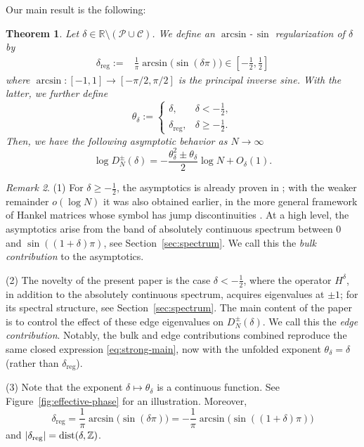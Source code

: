\documentclass[11pt,a4paper,reqno]{amsart}
\newtheorem{theorem}{Theorem}[section]
\theoremstyle{remark}
\newtheorem{remark}[theorem]{Remark}
\newcommand{\dist}{\operatorname{dist}}
\DeclarePairedDelimiter{\abs}{\lvert}{\rvert}
\begin{document}
Our main result is the following:

\begin{theorem}\label{thm:main}
Let $\delta\in\mathbb R\setminus(\mathcal P\cup\mathcal C)$. We define an $\arcsin$-\,$\sin$ regularization of $\delta$ by
\begin{align}\label{eq:def-sq}
 \delta_{\text{reg}}:=&\frac1\pi\arcsin\bigl(\sin(\delta\pi)\bigr)
 \in\left[-\frac12,\frac12\right]
\end{align}
where $\arcsin:[-1,1]\to[-\pi/2,\pi/2]$ is the principal inverse sine. With the latter, we further define
\begin{equation}\label{eq:effective-phase}
 \theta_\delta:=
 \begin{cases}
  \delta,&\delta < -\frac12,\\[1mm]
  \delta_{\text{reg}},&\delta \geq -\frac12.
 \end{cases}
\end{equation}
Then, we have the following asymptotic behavior as $N\to\infty$
\begin{equation}\label{eq:strong-main}
 \log D_N^\pm(\delta)
 =-\frac{\theta_\delta^2\pm\theta_\delta}{2}\log N+O_\delta(1).
\end{equation}
\end{theorem}

\begin{remark}
(1) For $\delta \geq -\frac12$, the asymptotics is already
proven in \cite{Otte}; with the weaker remainder $o(\log N)$ it was also
obtained earlier, in the more general framework of Hankel matrices whose symbol
has jump discontinuities \cite{FedeleGebert}. At a high level, the asymptotics arise from the band of absolutely continuous spectrum between \(0\) and \(\sin((1+\delta)\pi)\), see Section~\ref{sec:spectrum}. We call this the \emph{bulk contribution} to the asymptotics.

(2) The novelty of the present
paper is the case $\delta < -\frac12$, where the operator $H^\delta$, in addition to the absolutely continuous spectrum, acquires
eigenvalues at $\pm1$; for its spectral structure, see
Section~\ref{sec:spectrum}. The main content of the paper is to control the
effect of these edge eigenvalues on $D_N^\pm(\delta)$. We call this the \emph{edge contribution}. Notably, the bulk and edge contributions
 combined reproduce the same closed expression
\eqref{eq:strong-main}, now with the unfolded exponent $\theta_\delta=\delta$
(rather than $\delta_{\mathrm{reg}}$).

(3) Note that the exponent $\delta\mapsto\theta_\delta$ is a continuous function. See
Figure~\ref{fig:effective-phase} for an illustration.
Moreover,
\begin{equation}\label{eq:delta-reg-s}
  \delta_{\text{reg}}
    = \frac1\pi\arcsin\bigl(\sin(\delta\pi)\bigr)
    = - \frac1\pi\arcsin\bigl(\sin((1+\delta)\pi)\bigr)
\end{equation}
and $\abs{\delta_{\text{reg}}}=\dist(\delta,\mathbb Z)$.
\end{remark}
\end{document}
